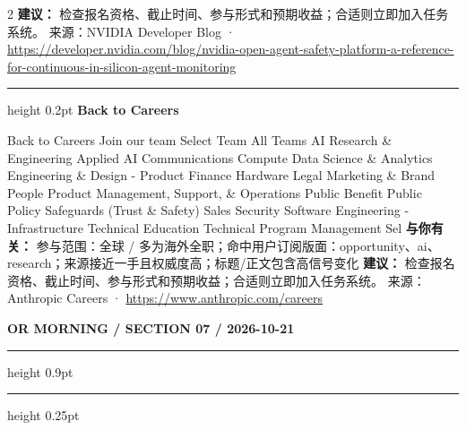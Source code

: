 \documentclass[10.5pt]{ctexart}
\begin{document}
\begin{multicols}{2}
\textbf{建议：} 检查报名资格、截止时间、参与形式和预期收益；合适则立即加入任务系统。
{\footnotesize\color{ormuted} 来源：NVIDIA Developer Blog · \url{https://developer.nvidia.com/blog/nvidia-open-agent-safety-platform-a-reference-for-continuous-in-silicon-agent-monitoring}}
\vspace{2mm}
\hrule height 0.2pt
\vspace{2mm}
{\large\bfseries Back to Careers}\par
Back to Careers Join our team Select Team All Teams AI Research \& Engineering Applied AI Communications Compute Data Science \& Analytics Engineering \& Design - Product Finance Hardware Legal Marketing \& Brand People Product Management, Support, \& Operations Public Benefit Public Policy Safeguards (Trust \& Safety) Sales Security Software Engineering - Infrastructure Technical Education Technical Program Management Sel
\textbf{与你有关：} 参与范围：全球 / 多为海外全职；命中用户订阅版面：opportunity、ai、research；来源接近一手且权威度高；标题/正文包含高信号变化
\textbf{建议：} 检查报名资格、截止时间、参与形式和预期收益；合适则立即加入任务系统。
{\footnotesize\color{ormuted} 来源：Anthropic Careers · \url{https://www.anthropic.com/careers}}
\end{multicols}
\newpage
{\small\bfseries OR MORNING / SECTION 07 / 2026-10-21}
\vspace{2mm}
\hrule height 0.9pt
\vspace{1.5mm}
\hrule height 0.25pt
\vspace{4mm}
\end{document}
